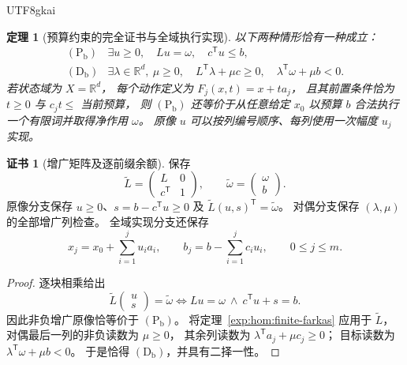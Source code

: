 \documentclass[12pt,a4paper,openany,notitlepage]{report}
\theoremstyle{plain}
\newtheorem{theorem}{定理}[chapter]
\theoremstyle{definition}
\newtheorem*{certificate}{证书}
\theoremstyle{remark}
\begin{document}
\begin{CJK*}{UTF8}{gkai}
\begin{theorem}[预算约束的完全证书与全域执行实现]
\label{exp:hom:budget-alternative}
以下两种情形恰有一种成立：
\[
 \begin{array}{ll}
 \mathrm{(P_b)}&
 \exists u\ge0,\quad Lu=\omega,\quad c^{\mathsf T}u\le b,\\[2pt]
 \mathrm{(D_b)}&
 \exists\lambda\in\mathbb R^d,\ \mu\ge0,\quad
 L^{\mathsf T}\lambda+\mu c\ge0,\quad
 \lambda^{\mathsf T}\omega+\mu b<0.
 \end{array}
\]
若状态域为 $X=\mathbb R^d$，
每个动作定义为 $F_j(x,t)=x+ta_j$，
且其前置条件恰为 $t\ge0$ 与 $c_jt\le$ 当前预算，
则 $\mathrm{(P_b)}$ 还等价于从任意给定 $x_0$
以预算 $b$ 合法执行一个有限词并取得净作用 $\omega$。
原像 $u$ 可以按列编号顺序、每列使用一次幅度 $u_j$ 实现。
\end{theorem}
\begin{certificate}[增广矩阵及逐前缀余额]
保存
\[
 \widetilde L=
 \begin{pmatrix}L&0\\c^{\mathsf T}&1\end{pmatrix},
 \qquad
 \widetilde\omega=\begin{pmatrix}\omega\\b\end{pmatrix}.
\]
原像分支保存 $u\ge0$、$s=b-c^{\mathsf T}u\ge0$
及 $\widetilde L(u,s)^{\mathsf T}=\widetilde\omega$。
对偶分支保存 $(\lambda,\mu)$ 的全部增广列检查。
全域实现分支还保存
\[
 x_j=x_0+\sum_{i=1}^{j}u_i a_i,\qquad
 b_j=b-\sum_{i=1}^{j}c_i u_i,\qquad 0\le j\le m.
\]
\end{certificate}
\begin{proof}
逐块相乘给出
\[
 \widetilde L\begin{pmatrix}u\\s\end{pmatrix}
 =\widetilde\omega
 \Longleftrightarrow
 Lu=\omega\ \land\ c^{\mathsf T}u+s=b.
\]
因此非负增广原像恰等价于 $\mathrm{(P_b)}$。
将定理~\ref{exp:hom:finite-farkas} 应用于 $\widetilde L$，
对偶最后一列的非负读数为 $\mu\ge0$，
其余列读数为 $\lambda^{\mathsf T}a_j+\mu c_j\ge0$；
目标读数为 $\lambda^{\mathsf T}\omega+\mu b<0$。
于是恰得 $\mathrm{(D_b)}$，并具有二择一性。


\end{proof}
\end{CJK*}
\end{document}
